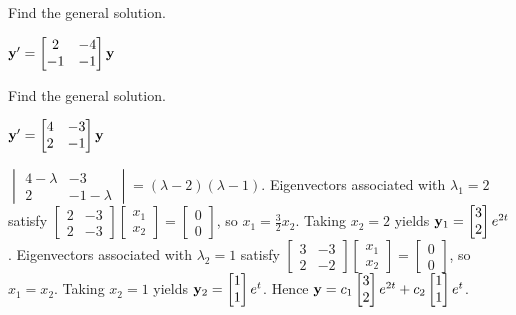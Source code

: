 \documentclass{ximera}
\begin{document}
\begin{problem}\label{exer:10.4.5} 
Find the general solution.

$ {\bf y}'=
\begin{bmatrix} 2&-4\\-1&-1\end{bmatrix}{\bf y}$
\end{problem}

\begin{problem}\label{exer:10.4.6} 
Find the general solution.

$ {\bf y}'=
\begin{bmatrix} 4&-3\\2&-1\end{bmatrix}{\bf y}$

\begin{solution}
    $ \begin{vmatrix}4-\lambda&-3\\2&-1-\lambda\end{vmatrix}
=(\lambda-2)(\lambda-1)$.
Eigenvectors  associated with $\lambda_1=2$  satisfy
$  \begin{bmatrix}2&-3\\2&-3
 \end{bmatrix} \begin{bmatrix}
x_1\\x_2 \end{bmatrix}= \begin{bmatrix} 0\\0 \end{bmatrix}$,
so $x_1=\frac{3 }{2}x_2$.  Taking $x_2=2$ yields
${\bf y}_1=  \begin{bmatrix}3\\2 \end{bmatrix}e^{2t}$.
Eigenvectors  associated with $\lambda_2=1$ satisfy
$  \begin{bmatrix}3&-3\\2&-2
 \end{bmatrix} \begin{bmatrix}
x_1\\x_2 \end{bmatrix}= \begin{bmatrix} 0\\0 \end{bmatrix}$,
so $x_1=x_2$.  Taking $x_2=1$ yields
${\bf y}_2=  \begin{bmatrix}1\\1 \end{bmatrix}e^t$.
Hence
 ${\bf y}= c_1 \begin{bmatrix}3\\2 \end{bmatrix}e^{2t}+c_2 \begin{bmatrix}1\\1 \end{bmatrix}e^t$.
\end{solution}

\end{problem}
\end{document}
